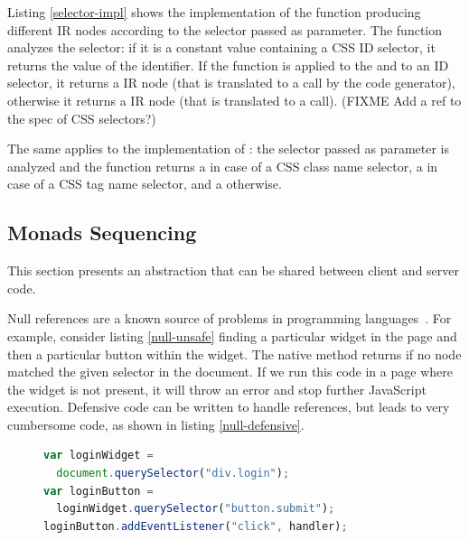 \documentclass[preprint]{sigplanconf}
\begin{document}
Listing \ref{selector-impl} shows the implementation of the  function producing different
IR nodes according to the selector passed as parameter. The  function analyzes
the selector: if it is a constant  value containing a CSS ID selector, it returns the
value of the identifier. If the  function is applied to the  and to an ID
selector, it returns a  IR node (that is translated to a
 call by the code generator), otherwise it returns a
 IR node (that is translated to a  call). (FIXME Add a ref to
the spec of CSS selectors?)

The same applies to the implementation of : the selector passed as parameter is
analyzed and the function returns a  in case of a CSS class
name selector, a  in case of a CSS tag name selector, and a
 otherwise.


\subsection{Monads Sequencing}

This section presents an abstraction that can be shared between client and server code.

Null references are a known source of problems in programming
languages~\cite{Hoare09_Null,Nanda09_Null}. For example, consider listing \ref{null-unsafe} finding
a particular widget in the page and then a particular button within the widget. The native
 method returns  if no node matched the given selector in the
document. If we run this code in a page where the widget is not present, it will throw an error
and stop further JavaScript execution. Defensive code can be written to handle 
references, but leads to very cumbersome code, as shown in listing \ref{null-defensive}.

\begin{figure}
\begin{lstlisting}[language=JavaScript,label=null-unsafe,caption=Unsafe code]
var loginWidget =
  document.querySelector("div.login");
var loginButton =
  loginWidget.querySelector("button.submit");
loginButton.addEventListener("click", handler);
\end{lstlisting}
\end{figure}
\end{document}
